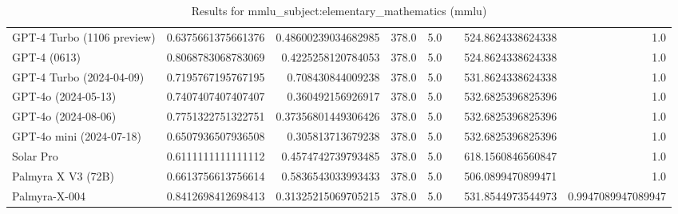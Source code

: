 \begin{table}[htp]
{\begin{tabular}{lrrrrrrr}
GPT-4 Turbo (1106 preview) & 0.6375661375661376 & 0.48600239034682985 & 378.0 & 5.0 &  & 524.8624338624338 & 1.0 \\
GPT-4 (0613) & 0.8068783068783069 & 0.4225258120784053 & 378.0 & 5.0 &  & 524.8624338624338 & 1.0 \\
GPT-4 Turbo (2024-04-09) & 0.7195767195767195 & 0.708430844009238 & 378.0 & 5.0 &  & 531.8624338624338 & 1.0 \\
GPT-4o (2024-05-13) & 0.7407407407407407 & 0.360492156926917 & 378.0 & 5.0 &  & 532.6825396825396 & 1.0 \\
GPT-4o (2024-08-06) & 0.7751322751322751 & 0.37356801449306426 & 378.0 & 5.0 &  & 532.6825396825396 & 1.0 \\
GPT-4o mini (2024-07-18) & 0.6507936507936508 & 0.305813713679238 & 378.0 & 5.0 &  & 532.6825396825396 & 1.0 \\
Solar Pro & 0.6111111111111112 & 0.4574742739793485 & 378.0 & 5.0 &  & 618.1560846560847 & 1.0 \\
Palmyra X V3 (72B) & 0.6613756613756614 & 0.5836543033993433 & 378.0 & 5.0 &  & 506.0899470899471 & 1.0 \\
Palmyra-X-004 & 0.8412698412698413 & 0.31325215069705215 & 378.0 & 5.0 &  & 531.8544973544973 & 0.9947089947089947 \\
\bottomrule
\end{tabular}}
\caption{Results for mmlu_subject:elementary_mathematics (mmlu)}
\label{fig:mmlu_subject:elementary_mathematics (mmlu)}
\end{table}